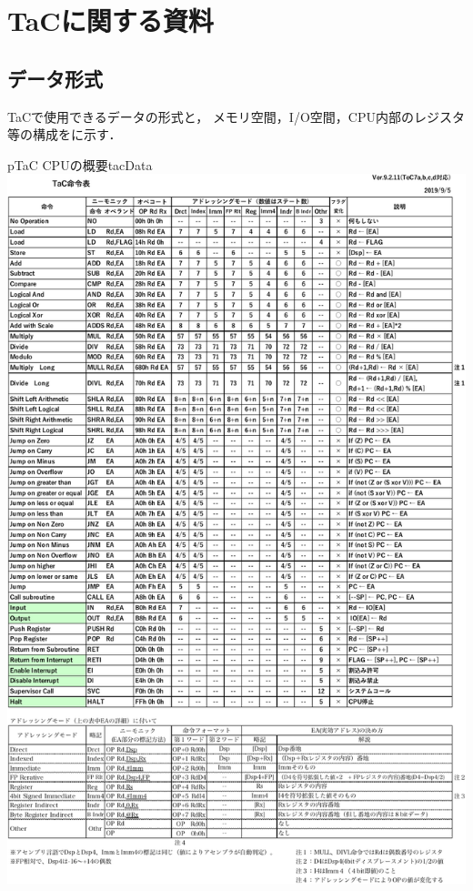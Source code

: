 \chapter{TaCに関する資料}
\label{appTac}

\section{データ形式}
TaCで使用できるデータの形式と，
メモリ空間，I/O空間，CPU内部のレジスタ等の構成をに示す．

\begin{myfig}{p}{TaC CPUの概要}{tacData}
  \includegraphics[scale=0.9,page=2]{Fig/TaCInst.pdf}
\end{myfig}

